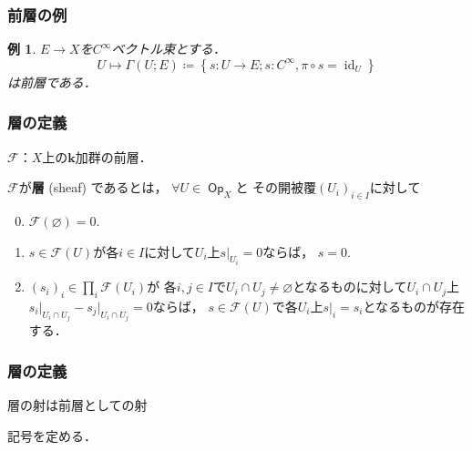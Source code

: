 \documentclass[dvipdfmx,12pt,aspectratio=169,leqno]{beamer}%
\newcommand{\kk}{\mathbf{k}}
\newcommand{\Ab}{{\bf Ab}}
\newcommand{\Mod}{\mathop{\mathrm{Mod}}\nolimits}
\numberwithin{equation}{subsection}
\newcommand{\Op}{\mathop{\textsf{Op}}\nolimits}
\newcommand{\id}{\mathop{\mathrm{id}}\nolimits}
\newcommand{\Sh}{\mathrm{Sh}}
\newcommand{\PSh}{\mathrm{PSh}}
\theoremstyle{mystyle}
\newtheorem{EG}[AXM]{例}
\begin{document}
\begin{frame}
    \frametitle{前層の例}
    \begin{EG}
        \(E\to X\)を\(C^{\infty}\)ベクトル束とする．
        \[
            U\mapsto \Gamma(U;E)\coloneqq
            \left\{s\colon U\to E;s\colon C^{\infty},\pi\circ s=\id_U\right\}
        \]は前層である．
    \end{EG}
\end{frame}

\begin{frame}
    \frametitle{層の定義}
    \begin{definition}[層]\label{def:sheaf}
        \(\mathscr{F}\)：\(X\)上の\(\kk\)加群の前層．
        
        \(\mathscr{F}\)が\textbf{層} (sheaf) であるとは，
        \(\forall U\in\Op_{X}\)と
        その開被覆\(\left(U_i\right)_{i\in I}\)に対して
        \begin{enumerate}[(S1)]
            \setcounter{enumi}{-1}
            \item \(\mathscr{F}(\varnothing)=0\).
            \item \(s\in\mathscr{F}(U)\)が各\(i\in I\)に対して\(U_i\)上\(s\rvert_{U_{i}}=0\)ならば，
            \(s=0\).\label{sheaf-cond1}
            \item \(\left(s_i\right)_i\in\prod_{i}\mathscr{F}(U_i)\)が
            各\(i,j\in I\)で\(U_i\cap U_j\ne\varnothing\)となるものに対して\(U_i\cap U_j\)上\(s_i\rvert_{U_i\cap U_j}-s_j\rvert_{U_i\cap U_j}=0\)ならば，
            \(s\in\mathscr{F}(U)\)で各\(U_i\)上\(s\rvert_i=s_i\)となるものが存在する．\label{sheaf-cond2}
        \end{enumerate}
    \end{definition}    
\end{frame}

\begin{frame}
    \frametitle{層の定義}
    層の射は前層としての射

    \bigskip
    記号を定める．
\end{frame}
\end{document}
